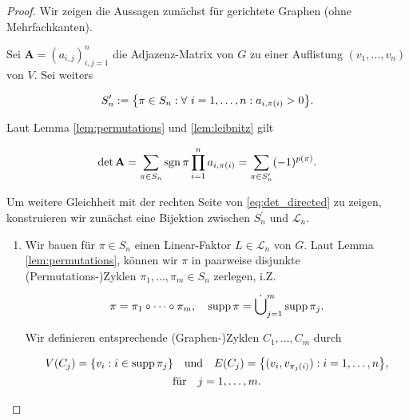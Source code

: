             \begin{proof}

                Wir zeigen die Aussagen zunächst für gerichtete Graphen (ohne Mehrfachkanten).

                Sei $\mathbf A = (a_{i,j})_{i,j=1}^n$ die Adjazenz-Matrix von $G$ zu einer Auflistung $(v_1, \dots, v_n)$ von $V$.
                Sei weiters

                \begin{align*}
                    S_n^\prime
                    :=
                    {\left \{ \pi \in S_n: \forall ~ i = 1, \dots, n: a_{i, \pi(i)} > 0 \right \}}.
                \end{align*}

                Laut Lemma \ref{lem:permutations} und \ref{lem:leibnitz} gilt

                \begin{align*}
                    \det \mathbf A
                    =
                    \sum_{\pi \in S_n}
                        \operatorname{sgn} \pi
                        \prod_{i=1}^n
                            a_{i, \pi(i)}
                    =
                    \sum_{\pi \in S_n^\prime}
                        (-1)^{p(\pi)}.
                \end{align*}

                Um weitere Gleichheit mit der rechten Seite von \ref{eq:det_directed} zu zeigen, konstruieren wir zunächst eine Bijektion zwischen $S_n^\prime$ und $\mathcal L_n$.

                \begin{enumerate}[label = \arabic*.]

                    \item Wir bauen für $\pi \in S_n$ einen Linear-Faktor $L \in \mathcal L_n$ von $G$.
                    Laut Lemma \ref{lem:permutations}, können wir $\pi$ in paarweise disjunkte (Permutations-)Zyklen $\pi_1, \dots, \pi_m \in S_n$ zerlegen, i.Z.

                    \begin{align*}
                        \pi = \pi_1 \circ \cdots \circ \pi_m,
                        \quad
                        \operatorname{supp} \pi = \dot \bigcup_{j=1}^m \operatorname{supp} \pi_j.
                    \end{align*}

                    Wir definieren entsprechende (Graphen-)Zyklen $C_1, \dots, C_m$ durch

                    \begin{multline*}
                        V(C_j) = {\left \{ v_i: i \in \operatorname{supp} \pi_j \right \}}
                        \quad
                        \text{und}
                        \quad
                        E(C_j) = {\left \{ (v_i, v_{\pi_j(i)}): i = 1, \dots, n \right \}}, \\
                        \text{für}
                        \quad
                        j = 1, \dots, m.
                    \end{multline*}


\end{enumerate}
\end{proof}
